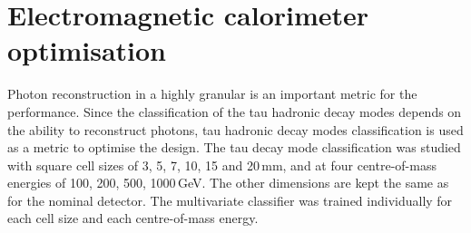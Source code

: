 










\section{Electromagnetic calorimeter optimisation}
\label{sec:tauECAL}

Photon reconstruction in a highly granular \ECAL is an important  metric for the \ECAL performance. Since the classification of the tau hadronic decay modes depends on the ability to reconstruct photons, tau hadronic decay modes classification is used as a metric to optimise the \ECAL design. The tau decay mode classification was studied with \ECAL square cell sizes of 3, 5, 7, 10, 15 and 20\,mm, and at four  centre-of-mass energies of 100, 200, 500, 1000\,GeV. The other \ECAL dimensions are kept the same as for  the \ILD nominal detector. The multivariate classifier was trained  individually for each \ECAL cell size and each centre-of-mass energy.


